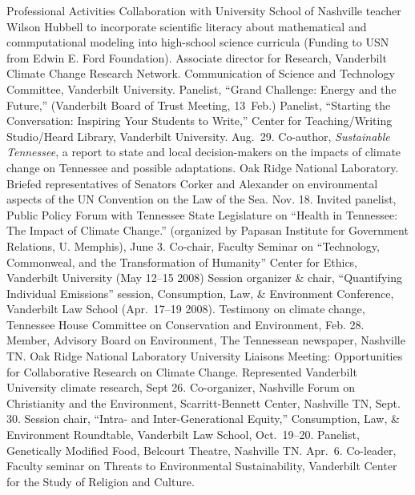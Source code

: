 %
%
\begin{rubric}{Professional Activities}%
\entry*[2015--]Collaboration with University School of Nashville teacher Wilson Hubbell to incorporate scientific literacy about mathematical and commputational modeling into high-school science curricula (Funding to USN from Edwin E. Ford Foundation).
\entry*[2007--]Associate director for Research, Vanderbilt Climate Change Research Network.
\entry*[2003--]Communication of Science and Technology Committee, Vanderbilt University.
\entry*[2015]Panelist, ``Grand Challenge: Energy and the Future,'' (Vanderbilt Board of Trust Meeting, 13~Feb.)
\entry*[2013]Panelist, ``Starting the Conversation: Inspiring Your Students to Write,'' Center for Teaching/Writing Studio/Heard Library, Vanderbilt University. Aug.~29.
\entry*[2012]Co-author, \textit{Sustainable Tennessee}, a report to state and local decision-makers on the impacts of climate change on Tennessee and possible adaptations. Oak Ridge National Laboratory.
\entry*[2009]Briefed representatives of Senators Corker and Alexander on environmental aspects of the UN Convention on the Law of the Sea.
Nov. 18.
\entry*[2008]Invited panelist, Public Policy Forum with Tennessee State Legislature on ``Health in Tennessee: The Impact of Climate Change.'' (organized by Papasan Institute for Government Relations, U. Memphis), June 3.
\entry*[2008]Co-chair, Faculty Seminar on ``Technology, Commonweal, and the Transformation of Humanity'' Center for Ethics, Vanderbilt University (May 12--15 2008)
\entry*[2008]Session organizer \& chair, ``Quantifying Individual Emissions'' session, Consumption, Law, \& Environment Conference, Vanderbilt Law School (Apr.~17--19 2008).
\entry*[2008]Testimony on climate change, Tennessee House Committee on Conservation and Environment, Feb. 28.
\entry*[2007--2009]Member, Advisory Board on Environment, The Tennessean newspaper, Nashville TN.
\entry*[2007]Oak Ridge National Laboratory University Liaisons Meeting: Opportunities for Collaborative Research on Climate Change. Represented Vanderbilt University climate research, Sept 26.
\entry*[2006]Co-organizer, Nashville Forum on Christianity and the Environment, Scarritt-Bennett Center, Nashville TN, Sept. 30.
\entry*[2006]Session chair, ``Intra- and Inter-Generational Equity,'' Consumption, Law, \& Environment Roundtable, Vanderbilt Law School, Oct.~19--20.
\entry*[2006]Panelist, Genetically Modified Food, Belcourt Theatre, Nashville TN. Apr.~6.
\entry*[2005]Co-leader, Faculty seminar on Threats to Environmental Sustainability, Vanderbilt Center for the Study of Religion and Culture.

\end{rubric}
